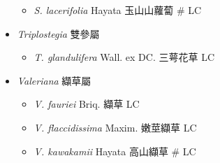 \begin{itemize}
  \begin{itemize}
        \item[] \textit{S. lacerifolia} Hayata  玉山山蘿蔔  \# LC
  \end{itemize}
 \item[] \textit{Triplostegia} 雙參屬
                                
  \begin{itemize}
        \item[] \textit{T. glandulifera} Wall. ex DC.  三萼花草   LC
  \end{itemize}
 \item[] \textit{Valeriana} 纈草屬
                                
  \begin{itemize}
        \item[] \textit{V. fauriei} Briq.  纈草   LC
        \item[] \textit{V. flaccidissima} Maxim.  嫩莖纈草   LC
        \item[] \textit{V. kawakamii} Hayata  高山纈草  \# LC
  \end{itemize}
  \end{itemize}
